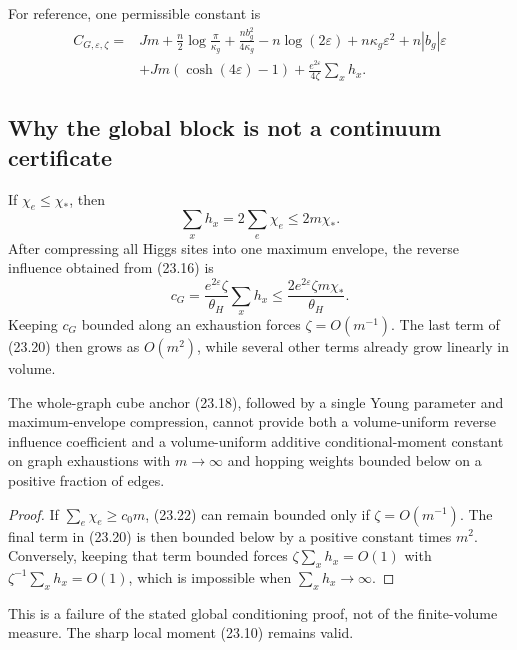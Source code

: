 \documentclass[11pt]{article}
\theoremstyle{remark}
\begin{document}
For reference, one permissible constant is
\[
\begin{aligned}
 C_{G,\varepsilon,\zeta}
={}&Jm+\frac n2\log\frac{\pi}{\kappa_g}
 +\frac{nb_g^2}{4\kappa_g}-n\log(2\varepsilon)
 +n\kappa_g\varepsilon^2+n|b_g|\varepsilon\\
 &+Jm(\cosh(4\varepsilon)-1)
 +\frac{e^{2\varepsilon}}{4\zeta}\sum_xh_x.
                                                               \tag{23.20}
\end{aligned}
\]

\subsection{Why the global block is not a continuum certificate}

If \(\chi_e\leq\chi_*\), then
\[
 \sum_xh_x=2\sum_e\chi_e\leq2m\chi_*.            \tag{23.21}
\]
After compressing all Higgs sites into one maximum envelope, the
reverse influence obtained from (23.16) is
\[
 c_G
 =\frac{e^{2\varepsilon}\zeta}{\theta_H}
 \sum_xh_x
 \leq\frac{2e^{2\varepsilon}\zeta m\chi_*}{\theta_H}.
                                                               \tag{23.22}
\]
Keeping \(c_G\) bounded along an exhaustion forces
\(\zeta=O(m^{-1})\).  The last term of (23.20) then grows as
\(O(m^2)\), while several other terms already grow linearly in volume.

\begin{countertheorem}
\label{ctr:v17v23-global}
The whole-graph cube anchor (23.18), followed by a single Young
parameter and maximum-envelope compression, cannot provide both a
volume-uniform reverse influence coefficient and a volume-uniform
additive conditional-moment constant on graph exhaustions with
\(m\to\infty\) and hopping weights bounded below on a positive fraction
of edges.
\end{countertheorem}

\begin{proof}
If \(\sum_e\chi_e\geq c_0m\), (23.22) can remain bounded only if
\(\zeta=O(m^{-1})\).  The final term in (23.20) is then bounded below by
a positive constant times \(m^2\).  Conversely, keeping that term
bounded forces \(\zeta\sum_xh_x=O(1)\) with
\(\zeta^{-1}\sum_xh_x=O(1)\), which is impossible when
\(\sum_xh_x\to\infty\).
\end{proof}

This is a failure of the stated global conditioning proof, not of the
finite-volume measure.  The sharp local moment (23.10) remains valid.
\end{document}

